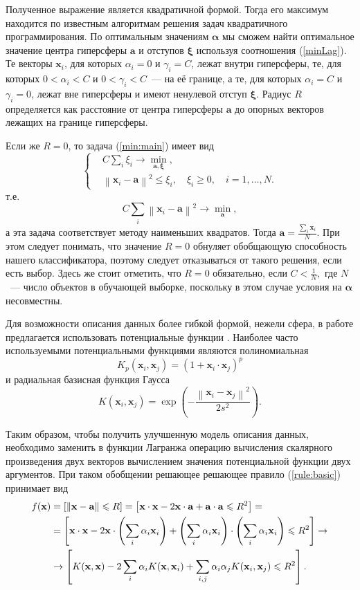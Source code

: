 \documentclass[12pt,a4paper]{article}
\newcommand\begcas[1]{\begin{cases}#1\end{cases}}
\def\le{\leqslant}
\def\ge{\geqslant}
\newcommand\mb[1]{\ensuremath{\boldsymbol{\mathbf{#1}}}}
\newcommand{\suml}{\sum\limits}
\newcommand\cbr[1]{\left(#1\right)} %
\newcommand\sbr[1]{\left[#1\right]} %
\newcommand\norm[1]{\ensuremath{\left\|{#1}\right\|}}
\begin{document}
	Полученное выражение является квадратичной формой. 
	Тогда его максимум находится по известным алгоритмам решения задач квадратичного программирования. 
	По оптимальным значениям $\mb{\alpha}$ мы сможем найти оптимальное значение центра гиперсферы $\mb a$ и отступов $\mb{\xi}$ используя соотношения (\ref{minLag}). 
	Те векторы $\mb x_i$, для которых $\alpha_i=0$ и $\gamma_i=C$, лежат внутри гиперсферы, те, для которых $0<\alpha_i<C$ и $0<\gamma_i<C$~--- на её границе, а те, для которых $\alpha_i=C$ и $\gamma_i=0$, лежат вне гиперсферы и имеют ненулевой отступ $\mb\xi$. 
	Радиус $R$ определяется как расстояние от центра гиперсферы $\mb a$ до опорных векторов лежащих на границе гиперсферы.

	Если же $R = 0$, то задача (\ref{min:main}) имеет вид 
	\begin{equation}
				\begcas{
				&C\suml_i\xi_i \to \min\limits_{\mb a, \mb\xi}, \\
				&\norm{\mb x_i-\mb a}^2\le \xi_i,\quad\xi_i\ge0,\quad i = 1,\ldots,N.
				} 
	\end{equation}
	т.е.
	\begin{equation}
				C\suml_i\norm{\mb x_i-\mb a}^2 \to \min\limits_{\mb a},
	\end{equation} 
	а эта задача соответствует методу наименьших квадратов. Тогда $\mb a = \frac{\sum_i \mb x_i}N$. 
	При этом следует понимать, что значение $R=0$ обнуляет обобщающую способность нашего классификатора, поэтому следует отказываться от такого решения, если есть выбор. 
	Здесь же стоит отметить, что $R = 0$ обязательно, если $C < \frac1N,$ где $N$~--- число объектов в обучающей выборке, поскольку в этом случае условия на $\mb \alpha$ несовместны.

	Для возможности описания данных более гибкой формой, нежели сфера, в работе \cite{Tax2001} предлагается использовать потенциальные функции \cite{Izerman1979}. Наиболее часто используемыми потенциальными функциями являются полиномиальная
	$$K_p(\mb x_i, \mb x_j) = \cbr{1 + \mb x_i \cdot \mb x_j}^p$$
	и радиальная базисная функция Гаусса
	$$K(\mb x_i, \mb x_j) = \exp\cbr{-\frac{\norm{\mb x_i - \mb x_j}^2}{2s^2}}.$$
	
	Таким образом, чтобы получить улучшенную модель описания данных, необходимо заменить в функции Лагранжа операцию вычисления
	скалярного произведения двух векторов вычислением значения потенциальной функции двух аргументов.
	При таком обобщении решающее решающее правило (\ref{rule:basic}) принимает вид 
	\begin{align}
		\label{rule:kernel}
		f(\mb x) 
			&= 	\sbr{\norm{\mb x-\mb a} \le R} 
			= 	\sbr{\mb x\cdot\mb x - 2\mb x\cdot\mb a + \mb a\cdot\mb a \le R^2} = \notag \\
			&= 	\sbr{\mb x\cdot\mb x - 2\mb x\cdot\cbr{\suml_{i} \alpha_i \mb x_i} + \cbr{\suml_{i} \alpha_i \mb x_i}\cdot\cbr{\suml_{i} \alpha_i \mb x_i} \le R^2} \to \notag \\
			&\to \sbr{K(\mb x,\mb x) - 2\suml_{i} \alpha_i K(\mb x, \mb x_i) + \suml_{i,j} \alpha_i\alpha_jK(\mb x_i,\mb x_j) \le R^2}.
	\end{align}
\end{document}
